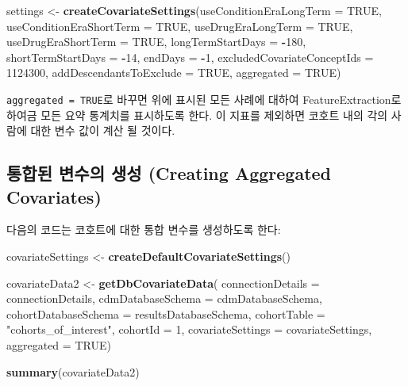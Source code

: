 \documentclass[11pt]{book}
\newenvironment{Shaded}{\begin{snugshade}}{\end{snugshade}}
\newcommand{\KeywordTok}[1]{\textcolor[rgb]{0.13,0.29,0.53}{\textbf{#1}}}
\newcommand{\DataTypeTok}[1]{\textcolor[rgb]{0.13,0.29,0.53}{#1}}
\newcommand{\DecValTok}[1]{\textcolor[rgb]{0.00,0.00,0.81}{#1}}
\newcommand{\StringTok}[1]{\textcolor[rgb]{0.31,0.60,0.02}{#1}}
\newcommand{\OtherTok}[1]{\textcolor[rgb]{0.56,0.35,0.01}{#1}}
\newcommand{\OperatorTok}[1]{\textcolor[rgb]{0.81,0.36,0.00}{\textbf{#1}}}
\newcommand{\NormalTok}[1]{#1}
\theoremstyle{definition}
\theoremstyle{definition}
\theoremstyle{definition}
\theoremstyle{remark}
\let\BeginKnitrBlock\begin \let\EndKnitrBlock\end
\begin{document}
\begin{Shaded}
\begin{Highlighting}[]
\NormalTok{settings <-}\StringTok{ }\KeywordTok{createCovariateSettings}\NormalTok{(}\DataTypeTok{useConditionEraLongTerm =} \OtherTok{TRUE}\NormalTok{, }
                                    \DataTypeTok{useConditionEraShortTerm =} \OtherTok{TRUE}\NormalTok{, }
                                    \DataTypeTok{useDrugEraLongTerm =} \OtherTok{TRUE}\NormalTok{, }
                                    \DataTypeTok{useDrugEraShortTerm =} \OtherTok{TRUE}\NormalTok{, }
                                    \DataTypeTok{longTermStartDays =} \OperatorTok{-}\DecValTok{180}\NormalTok{, }
                                    \DataTypeTok{shortTermStartDays =} \OperatorTok{-}\DecValTok{14}\NormalTok{, }
                                    \DataTypeTok{endDays =} \OperatorTok{-}\DecValTok{1}\NormalTok{, }
                                    \DataTypeTok{excludedCovariateConceptIds =} \DecValTok{1124300}\NormalTok{, }
                                    \DataTypeTok{addDescendantsToExclude =} \OtherTok{TRUE}\NormalTok{, }
                                    \DataTypeTok{aggregated =} \OtherTok{TRUE}\NormalTok{) }
\end{Highlighting}
\end{Shaded}

\BeginKnitrBlock{rmdimportant}
\texttt{aggregated\ =\ TRUE}로 바꾸면 위에 표시된 모든 사례에 대하여
FeatureExtraction로 하여금 모든 요약 통계치를 표시하도록 한다. 이 지표를
제외하면 코호트 내의 각의 사람에 대한 변수 값이 계산 될 것이다.
\EndKnitrBlock{rmdimportant}

\subsection{통합된 변수의 생성 (Creating Aggregated
Covariates)}\label{---creating-aggregated-covariates}

다음의 코드는 코호트에 대한 통합 변수를 생성하도록 한다:

\begin{Shaded}
\begin{Highlighting}[]
\NormalTok{covariateSettings <-}\StringTok{ }\KeywordTok{createDefaultCovariateSettings}\NormalTok{() }

\NormalTok{covariateData2 <-}\StringTok{ }\KeywordTok{getDbCovariateData}\NormalTok{(}
  \DataTypeTok{connectionDetails =}\NormalTok{ connectionDetails, }
  \DataTypeTok{cdmDatabaseSchema =}\NormalTok{ cdmDatabaseSchema, }
  \DataTypeTok{cohortDatabaseSchema =}\NormalTok{ resultsDatabaseSchema, }
  \DataTypeTok{cohortTable =} \StringTok{"cohorts_of_interest"}\NormalTok{, }
  \DataTypeTok{cohortId =} \DecValTok{1}\NormalTok{, }
  \DataTypeTok{covariateSettings =}\NormalTok{ covariateSettings, }
  \DataTypeTok{aggregated =} \OtherTok{TRUE}\NormalTok{) }

\KeywordTok{summary}\NormalTok{(covariateData2) }
\end{Highlighting}
\end{Shaded}
\end{document}
